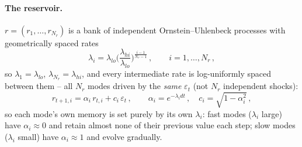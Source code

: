 \documentclass[11pt]{article}
\begin{document}
\paragraph{The reservoir.} $r=(r_1,\dots,r_{N_r})$ is a bank of independent
Ornstein--Uhlenbeck processes with geometrically spaced rates
\begin{equation}
\lambda_i = \lambda_{lo}\Big(\frac{\lambda_{hi}}{\lambda_{lo}}\Big)^{\frac{i-1}{N_r-1}}\, ,
\qquad i=1,\dots,N_r\, ,
\label{eq:lambdaspacing}
\end{equation}
so $\lambda_1=\lambda_{lo}$, $\lambda_{N_r}=\lambda_{hi}$, and every
intermediate rate is log-uniformly spaced between them -- all $N_r$ modes
driven by the \emph{same} $\varepsilon_t$ (not $N_r$ independent shocks):
\begin{equation}
r_{t+1,i} = \alpha_i\, r_{t,i} + c_i\,\varepsilon_t\, ,\qquad
\alpha_i = e^{-\lambda_i dt}\, ,\quad c_i=\sqrt{1-\alpha_i^2}\, ,
\label{eq:reservoir}
\end{equation}
so each mode's own memory is set purely by its own $\lambda_i$: fast modes
($\lambda_i$ large) have $\alpha_i\approx0$ and retain almost none of their
previous value each step; slow modes ($\lambda_i$ small) have $\alpha_i
\approx1$ and evolve gradually.
\end{document}
